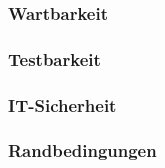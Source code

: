

\subsubsection{Wartbarkeit}



\subsubsection{Testbarkeit}



\subsubsection{IT-Sicherheit}



\subsubsection{Randbedingungen}

